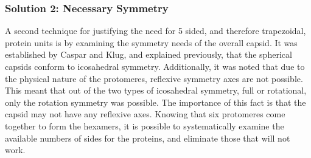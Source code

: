 \documentclass[12pt,letter]{article}
\begin{document}
\subsubsection{Solution 2: Necessary Symmetry}
A second technique for justifying the need for 5 sided, and therefore trapezoidal, protein units is by examining the symmetry needs of the overall capsid. It was established by Caspar and Klug, and explained previously, that the spherical capsids conform to icosahedral symmetry. Additionally, it was noted that due to the physical nature of the protomeres, reflexive symmetry axes are not possible. This meant that out of the two types of icosahedral symmetry, full or rotational, only the rotation symmetry was possible. The importance of this fact is that the capsid may not have any reflexive axes. Knowing that six protomeres come together to form the hexamers, it is possible to systematically examine the available numbers of sides for the proteins, and eliminate those that will not work. 
\end{document}
